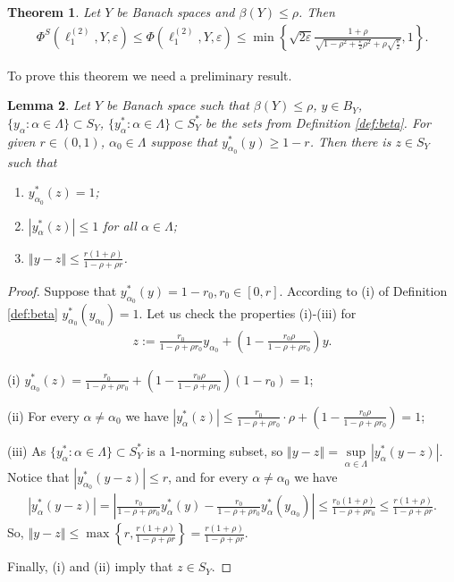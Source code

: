 \documentclass[11pt,a4paper]{amsart}
\newcommand{\eps}{\varepsilon}
\newcommand{\norm}[1]{\left\Vert#1\right\Vert}
\numberwithin{equation}{section}
\theoremstyle{plain}
\newtheorem{theorem}{Theorem}[section]
\newtheorem{lemma}[theorem]{Lemma}
\theoremstyle{definition}
\renewcommand{\leq}{\leqslant}
\renewcommand{\geq}{\geqslant}
\begin{document}
\begin{theorem}\label{th:ell_1}
Let $Y$ be Banach spaces and  $\beta(Y)\leq\rho$. Then 
\begin{align}\label{eq:ell_1}
\Phi^S(\ell^{(2)}_1,Y,\varepsilon)\leq\Phi(\ell^{(2)}_1,Y,\varepsilon)\leq\min\left\{\sqrt{2\varepsilon}\frac{1+\rho}{\sqrt{1-\rho^2+\frac{\eps}{2}\rho^2}+\rho\sqrt{\frac{\eps}{2}}}, 1\right\}.
\end{align}
\end{theorem}
To prove this theorem we need a preliminary result.

\begin{lemma}\label{lemma_grani}
Let $Y$ be Banach space such that $\beta(Y)\leq\rho$, $y\in B_Y$, $\{y_\alpha: \alpha\in \Lambda\}\subset S_Y$, $\{y^*_\alpha: \alpha\in  \Lambda\}\subset S_Y^*$  be the sets from Definition \ref{def:beta}.  For given $r \in (0,1)$, $\alpha_0\in  \Lambda$ suppose that  $y^*_{\alpha_0}(y)\geq 1- r$. Then there is $z\in S_Y$ such that
\begin{enumerate}
\item $y^*_{\alpha_0}(z)=1$;

\item $|y^*_{\alpha}(z)| \leq 1$ for all $\alpha\in  \Lambda$;

\item $\norm{y-z}\leq\frac{r(1+\rho)}{1-\rho+\rho r}$.
\end{enumerate}
\end{lemma}
\begin{proof}
Suppose that $y^*_{\alpha_0}(y)=1-r_0, r_0\in[0, r]$. According to (i) of   Definition \ref{def:beta} $y^*_{\alpha_0}(y_{\alpha_0})=1$.
Let us check  the properties (i)-(iii) for
\begin{align*}
z:=\frac{r_0}{1-\rho+\rho r_0}y_{\alpha_0}+\left(1-\frac{r_0\rho}{1-\rho+\rho r_0}\right)y.
\end{align*}


\noindent (i) $y^*_{\alpha_0}(z) = \frac{r_0}{1-\rho+\rho r_0}+\left(1-\frac{r_0\rho}{1-\rho+\rho r_0}\right)(1-r_0)=1$;


\noindent (ii) For every $\alpha\neq\alpha_0$ we have $|y^*_{\alpha}(z)|\leq\frac{r_0}{1-\rho+\rho r_0}\cdot \rho+\left(1-\frac{r_0\rho}{1-\rho+\rho r_0}\right)=1$;

\noindent (iii) As $\{y^*_\alpha: \alpha\in  \Lambda\}\subset S_Y^*$ is a 1-norming subset, so $\norm{y-z}=\underset{\alpha\in  \Lambda}{\sup} |y^*_\alpha(y-z)|$. Notice that $|y^*_{\alpha_0}(y-z)| \leq r$, and for every $\alpha\neq\alpha_0$ we have 
\begin{align*}
|y^*_{\alpha}(y-z)|=\left|\frac{r_0}{1-\rho+\rho r_0}y^*_{\alpha}(y)-\frac{r_0}{1-\rho+\rho r_0}y^*_{\alpha}(y_{\alpha_0})\right|\leq\frac{r_0(1+\rho)}{1-\rho+\rho r_0}\leq\frac{r(1+\rho)}{1-\rho+\rho r}.
\end{align*}
So, $\norm{y-z}\leq \max\left\{r, \frac{r(1+\rho)}{1-\rho+\rho r}\right\}=\frac{r(1+\rho)}{1-\rho+\rho r}$.

\noindent Finally, (i) and (ii) imply that  $z\in S_Y$.
\end{proof}
\end{document}
